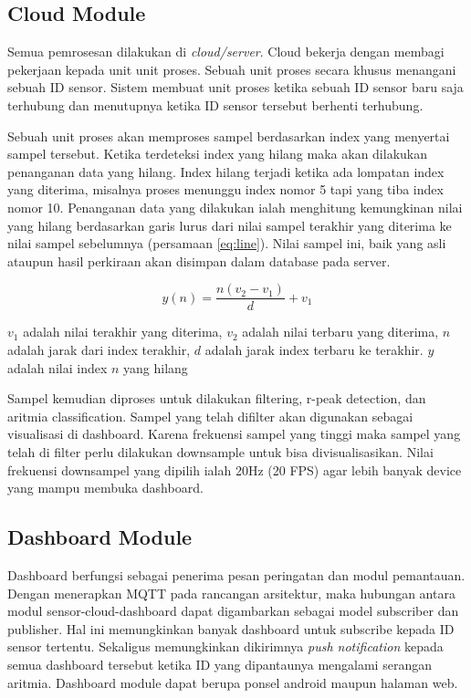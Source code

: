 \documentclass[conference]{IEEEtran}
\begin{document}
\subsection{Cloud Module}
Semua pemrosesan dilakukan di \textit{cloud/server}. Cloud bekerja dengan membagi pekerjaan kepada unit unit proses. Sebuah unit proses secara khusus menangani sebuah ID sensor. Sistem membuat unit proses ketika sebuah ID sensor baru saja terhubung dan menutupnya ketika ID sensor tersebut berhenti terhubung. 

Sebuah unit proses akan memproses sampel berdasarkan index yang menyertai sampel tersebut. Ketika terdeteksi index yang hilang maka akan dilakukan penanganan data yang hilang. Index hilang terjadi ketika ada lompatan index yang diterima, misalnya proses menunggu index nomor 5 tapi yang tiba index nomor 10. Penanganan data yang dilakukan ialah menghitung kemungkinan nilai yang hilang berdasarkan garis lurus dari nilai sampel terakhir yang diterima ke nilai sampel sebelumnya (persamaan \ref{eq:line}). Nilai sampel ini, baik yang asli ataupun hasil perkiraan akan disimpan dalam database pada server.

\begin{equation}
y(n) = \dfrac{n (v_{2} - v_{1})}{d} + v_{1}
\label{eq:line}
\end{equation}

$v_{1}$ adalah nilai terakhir yang diterima, $v_{2}$ adalah nilai terbaru yang diterima, $n$ adalah jarak dari index terakhir, $d$ adalah jarak index terbaru ke terakhir. $y$ adalah nilai index $n$ yang hilang

Sampel kemudian diproses untuk dilakukan filtering, r-peak detection, dan aritmia classification. Sampel yang telah difilter akan digunakan sebagai visualisasi di dashboard. Karena frekuensi sampel yang tinggi maka sampel yang telah di filter perlu dilakukan downsample untuk bisa divisualisasikan. Nilai frekuensi downsampel yang dipilih ialah 20Hz (20 FPS) agar lebih banyak device yang mampu membuka dashboard.

\subsection{Dashboard Module}
Dashboard berfungsi sebagai penerima pesan peringatan dan modul pemantauan. Dengan menerapkan MQTT pada rancangan arsitektur, maka hubungan antara modul sensor-cloud-dashboard dapat digambarkan sebagai model subscriber dan publisher. Hal ini memungkinkan banyak dashboard untuk subscribe kepada ID sensor tertentu. Sekaligus memungkinkan dikirimnya \textit{push notification} kepada semua dashboard tersebut ketika ID yang dipantaunya mengalami serangan aritmia. Dashboard module dapat berupa ponsel android maupun halaman web.
\end{document}
